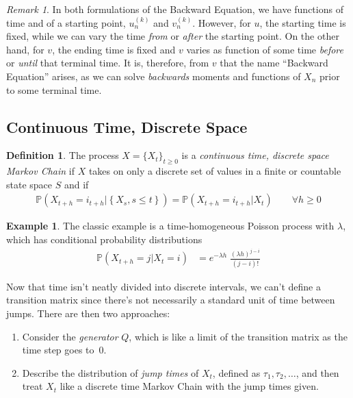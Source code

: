 \documentclass[12pt]{article}
\theoremstyle{plain}
\theoremstyle{definition}
\newtheorem{defn}[thm]{Definition}
\newtheorem{ex}[thm]{Example}
\theoremstyle{remark}
\newtheorem*{rmk}{Remark}
\begin{document}
\begin{rmk}
In both formulations of the Backward Equation, we have functions of time
and of a starting point, $u^{(k)}_n$ and $v^{(k)}_n$. However, for $u$,
the starting time is fixed, while we can vary the time \emph{from} or
\emph{after} the starting point. On the other hand, for $v$, the ending
time is fixed and $v$ varies as function of some time \emph{before} or
\emph{until} that terminal time. It is, therefore, from $v$ that the
name ``Backward Equation'' arises, as we can solve \emph{backwards}
moments and functions of $X_n$ prior to some terminal time.
\end{rmk}

\subsection{Continuous Time, Discrete Space}

\begin{defn}
The process $X=\{X_t\}_{t\geq 0}$ is a \emph{continuous time, discrete
space Markov Chain} if $X$ takes on only a discrete set of values in a
finite or countable state space $S$ and if
\begin{align*}
  \mathbb{P}\left(X_{t+h} = i_{t+h} | \left\{ X_{s}, s\leq t\right\}\right)
  =
  \mathbb{P}(X_{t+h} = i_{t+h} | X_{t} )
  \qquad \forall h \geq 0
\end{align*}
\end{defn}
\begin{ex}
The classic example is a time-homogeneous Poisson process with
$\lambda$, which has conditional probability distributions
\begin{align*}
  \mathbb{P}(X_{t+h}=j|X_t=i)
  &= e^{-\lambda h} \;
  \frac{(\lambda h)^{j-i}}{(j-i)!}
\end{align*}
\end{ex}

Now that time isn't neatly divided into discrete intervals, we can't
define a transition matrix since there's not necessarily a standard unit
of time between jumps. There are then two approaches:
\begin{enumerate}
  \item Consider the \emph{generator} $Q$, which is like a limit of the
    transition matrix as the time step goes to~0.
  \item Describe the distribution of \emph{jump times} of $X_t$, defined
    as $\tau_1, \tau_2,\ldots$, and then treat $X_t$ like a discrete
    time Markov Chain with the jump times given.
\end{enumerate}
\end{document}

